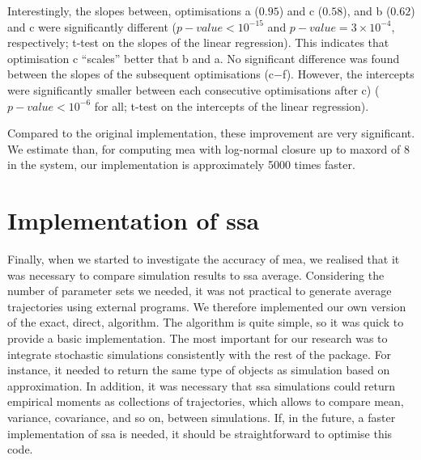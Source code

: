 Interestingly, the slopes between, optimisations a ($0.95$) and c ($0.58$), and b ($0.62$) and c were significantly different ($p-value <10^{-15}$ and $p-value = 3 \times 10^{-4}$, respectively;
t-test on the slopes of the linear regression). This indicates that optimisation c ``scales'' better that b and a.
No significant difference was found between the slopes of the subsequent optimisations (c$-$f).
However, the intercepts were significantly smaller between each consecutive optimisations after c) ($p-value < 10^{-6}$ for all; t-test on the intercepts of the linear regression).

Compared to the original \mat{} implementation, these improvement are very significant. We estimate than, for computing \gls{mea} with log-normal closure up to \gls{maxord}
of 8 in the \pft{} system, our implementation is approximately 5000 times faster.

\section{Implementation of \acrlong{ssa}}
Finally, when we started to investigate the accuracy of \gls{mea}, 
we realised that it was necessary to compare simulation results to \gls{ssa} average\cite{gillespie_general_1976}.
Considering the number of parameter sets we needed, it was not practical to generate average trajectories using external programs.
We therefore implemented our own version of the exact, direct, algorithm.
The algorithm is quite simple, so it was quick to provide a basic implementation.
The most important for our research was to integrate stochastic simulations consistently with the rest of the package.
For instance, it needed to return the same type of objects as simulation based on approximation.
In addition, it was necessary that \gls{ssa} simulations could return empirical moments as collections of trajectories,
which allows to compare mean, variance, covariance, and so on, between simulations.
If, in the future, a faster implementation of \gls{ssa} is needed, it should be straightforward to optimise this code.



